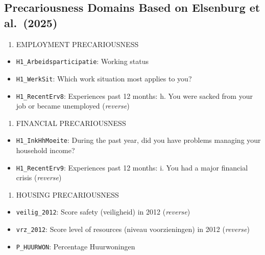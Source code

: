 \documentclass[
]{article}
\providecommand{\tightlist}{%
  \setlength{\itemsep}{0pt}\setlength{\parskip}{0pt}}\usepackage{longtable,booktabs,array}
\begin{document}
\subsection{Precariousness Domains Based on Elsenburg et
al.~(2025)}\label{precariousness-domains-based-on-elsenburg-et-al.-2025}

\begin{enumerate}
\def\labelenumi{\arabic{enumi}.}
\tightlist
\item
  EMPLOYMENT PRECARIOUSNESS
\end{enumerate}

\begin{itemize}
\tightlist
\item
  \texttt{H1\_Arbeidsparticipatie}: Working status
\item
  \texttt{H1\_WerkSit}: Which work situation most applies to you?
\item
  \texttt{H1\_RecentErv8}: Experiences past 12 months: h. You were
  sacked from your job or became unemployed (\emph{reverse})
\end{itemize}

\begin{enumerate}
\def\labelenumi{\arabic{enumi}.}
\setcounter{enumi}{1}
\tightlist
\item
  FINANCIAL PRECARIOUSNESS
\end{enumerate}

\begin{itemize}
\tightlist
\item
  \texttt{H1\_InkHhMoeite}: During the past year, did you have problems
  managing your household income?
\item
  \texttt{H1\_RecentErv9}: Experiences past 12 months: i. You had a
  major financial crisis (\emph{reverse})
\end{itemize}

\begin{enumerate}
\def\labelenumi{\arabic{enumi}.}
\setcounter{enumi}{2}
\tightlist
\item
  HOUSING PRECARIOUSNESS
\end{enumerate}

\begin{itemize}
\tightlist
\item
  \texttt{veilig\_2012}: Score safety (veiligheid) in 2012
  (\emph{reverse})
\item
  \texttt{vrz\_2012}: Score level of resources (niveau voorzieningen) in
  2012 (\emph{reverse})
\item
  \texttt{P\_HUURWON}: Percentage Huurwoningen
\end{itemize}
\end{document}
